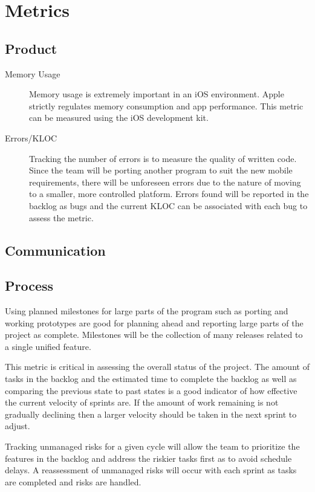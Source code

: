 \section{Metrics}

\subsection{Product}
\begin{description}
	\item[Memory Usage] Memory usage is extremely important in an iOS environment.  Apple strictly regulates memory consumption and app performance.  This metric can be measured using the iOS development kit.
	\item[Errors/KLOC] Tracking the number of errors is to measure the quality of written code.  Since the team will be porting another program to suit the new mobile requirements, there will be unforeseen errors due to the nature of moving to a smaller, more controlled platform.  Errors found will be reported in the backlog as bugs and the current KLOC can be associated with each bug to assess the metric.
\end{description}

\subsection{Communication}

\subsection{Process}
	\item[Milestones] Using planned milestones for large parts of the program such as porting and working prototypes are good for planning ahead and reporting large parts of the project as complete.  Milestones will be the collection of many releases related to a single unified feature.
	\item[Backlog Tasks] This metric is critical in assessing the overall status of the project.  The amount of tasks in the backlog and the estimated time to complete the backlog as well as comparing the previous state to past states is a good indicator of how effective the current velocity of sprints are.  If the amount of work remaining is not gradually declining then a larger velocity should be taken in the next sprint to adjust.
	\item[Unmanaged Risks]  Tracking unmanaged risks for a given cycle will allow the team to prioritize the features in the backlog and address the riskier tasks first as to avoid schedule delays.  A reassessment of unmanaged risks will occur with each sprint as tasks are completed and risks are handled.